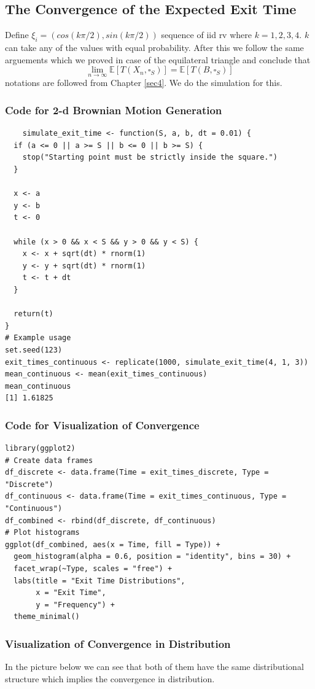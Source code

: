 \documentclass[11pt, a4paper, oneside]{report}
\numberwithin{equation}{section}
\begin{document}
\subsection{The Convergence of the Expected Exit Time}
Define $\xi_i=(cos(k\pi/2),sin(k\pi/2))$ sequence of iid rv where $k=1,2,3,4$. $k$ can take any of the values with equal probability. After this we follow the same arguements which we proved in case of the equilateral triangle and conclude that 
\[
\lim_{n \to \infty} \mathbb{E}\left[T(X_n, \square_S)\right] = \mathbb{E}\left[T(B, \square_S)\right]
\]
notations are followed from Chapter \ref{sec4}. We do the simulation for this.
\subsubsection{Code for 2-d Brownian Motion Generation}
\begin{verbatim}
    simulate_exit_time <- function(S, a, b, dt = 0.01) {
  if (a <= 0 || a >= S || b <= 0 || b >= S) {
    stop("Starting point must be strictly inside the square.")
  }
  
  x <- a
  y <- b
  t <- 0
  
  while (x > 0 && x < S && y > 0 && y < S) {
    x <- x + sqrt(dt) * rnorm(1)
    y <- y + sqrt(dt) * rnorm(1)
    t <- t + dt
  }
  
  return(t)
}
# Example usage
set.seed(123)
exit_times_continuous <- replicate(1000, simulate_exit_time(4, 1, 3))
mean_continuous <- mean(exit_times_continuous)
mean_continuous
[1] 1.61825
\end{verbatim}
\subsubsection{Code for Visualization of Convergence}
\begin{verbatim}
library(ggplot2)
# Create data frames
df_discrete <- data.frame(Time = exit_times_discrete, Type = "Discrete")
df_continuous <- data.frame(Time = exit_times_continuous, Type = "Continuous")
df_combined <- rbind(df_discrete, df_continuous)
# Plot histograms
ggplot(df_combined, aes(x = Time, fill = Type)) +
  geom_histogram(alpha = 0.6, position = "identity", bins = 30) +
  facet_wrap(~Type, scales = "free") +
  labs(title = "Exit Time Distributions",
       x = "Exit Time",
       y = "Frequency") +
  theme_minimal()
\end{verbatim}

\subsubsection{Visualization of Convergence in Distribution}
In the picture below we can see that both of them have the same distributional structure which implies the convergence in distribution.
\end{document}
